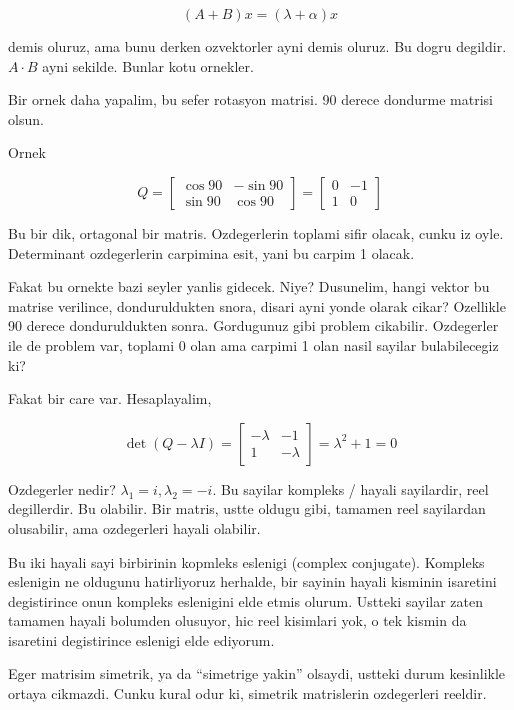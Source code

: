 \documentclass[12pt,fleqn]{article}\usepackage{../common}
\begin{document}
$$ (A+B)x = (\lambda+\alpha)x $$

demis oluruz, ama bunu derken ozvektorler ayni demis oluruz. Bu dogru
degildir. $A \cdot B$ ayni sekilde. Bunlar kotu ornekler. 

Bir ornek daha yapalim, bu sefer rotasyon matrisi. 90 derece dondurme
matrisi olsun.

Ornek

$$ Q =  
\left[\begin{array}{ccc}
\cos 90 & -\sin 90 \\
\sin 90 & \cos 90
\end{array}\right]
= \left[\begin{array}{ccc}
0 & -1\\
1  & 0
\end{array}\right]
$$

Bu bir dik, ortagonal bir matris. Ozdegerlerin toplami sifir olacak, cunku
iz oyle. Determinant ozdegerlerin carpimina esit, yani bu carpim 1 olacak. 

Fakat bu ornekte bazi seyler yanlis gidecek. Niye? Dusunelim, hangi vektor
bu matrise verilince, donduruldukten snora, disari ayni yonde olarak cikar?
Ozellikle 90 derece donduruldukten sonra. Gordugunuz gibi problem
cikabilir.  Ozdegerler ile de problem var, toplami 0 olan ama carpimi 1
olan nasil sayilar bulabilecegiz ki?

Fakat bir care var. Hesaplayalim, 

$$ \det(Q - \lambda I) = 
\left[\begin{array}{ccc}
-\lambda & -1 \\
1 & -\lambda
\end{array}\right] = \lambda^2 + 1 = 0
 $$

Ozdegerler nedir? $\lambda_1 = i, \lambda_2 = -i$. Bu sayilar kompleks / hayali
sayilardir, reel degillerdir. Bu olabilir. Bir matris, ustte oldugu gibi,
tamamen reel sayilardan olusabilir, ama ozdegerleri hayali olabilir. 

Bu iki hayali sayi birbirinin kopmleks eslenigi (complex
conjugate). Kompleks eslenigin ne oldugunu hatirliyoruz herhalde, bir
sayinin hayali kisminin isaretini degistirince onun kompleks eslenigini
elde etmis olurum. Ustteki sayilar zaten tamamen hayali bolumden olusuyor,
hic reel kisimlari yok, o tek kismin da isaretini degistirince eslenigi
elde ediyorum. 

Eger matrisim simetrik, ya da ``simetrige yakin'' olsaydi, ustteki durum
kesinlikle ortaya cikmazdi. Cunku kural odur ki, simetrik matrislerin
ozdegerleri reeldir. 
\end{document}
